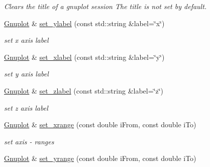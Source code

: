 \begin{DoxyCompactItemize}
\begin{DoxyCompactList}\small\item\em Clears the title of a gnuplot session The title is not set by default. \end{DoxyCompactList}\item 
\hyperlink{classkukadu_1_1Gnuplot}{Gnuplot} \& \hyperlink{classkukadu_1_1Gnuplot_abee1cfd744420fd989db8092acedcc93}{set\+\_\+ylabel} (const std\+::string \&label=\char`\"{}x\char`\"{})\hypertarget{classkukadu_1_1Gnuplot_abee1cfd744420fd989db8092acedcc93}{}\label{classkukadu_1_1Gnuplot_abee1cfd744420fd989db8092acedcc93}

\begin{DoxyCompactList}\small\item\em set x axis label \end{DoxyCompactList}\item 
\hyperlink{classkukadu_1_1Gnuplot}{Gnuplot} \& \hyperlink{classkukadu_1_1Gnuplot_a48b3c2b23f740375b73d27d1906968d0}{set\+\_\+xlabel} (const std\+::string \&label=\char`\"{}y\char`\"{})\hypertarget{classkukadu_1_1Gnuplot_a48b3c2b23f740375b73d27d1906968d0}{}\label{classkukadu_1_1Gnuplot_a48b3c2b23f740375b73d27d1906968d0}

\begin{DoxyCompactList}\small\item\em set y axis label \end{DoxyCompactList}\item 
\hyperlink{classkukadu_1_1Gnuplot}{Gnuplot} \& \hyperlink{classkukadu_1_1Gnuplot_a439a74f49c171b12df1a941a39b3e8c1}{set\+\_\+zlabel} (const std\+::string \&label=\char`\"{}z\char`\"{})\hypertarget{classkukadu_1_1Gnuplot_a439a74f49c171b12df1a941a39b3e8c1}{}\label{classkukadu_1_1Gnuplot_a439a74f49c171b12df1a941a39b3e8c1}

\begin{DoxyCompactList}\small\item\em set z axis label \end{DoxyCompactList}\item 
\hyperlink{classkukadu_1_1Gnuplot}{Gnuplot} \& \hyperlink{classkukadu_1_1Gnuplot_a1e27f156415728196a52946e304f5d1e}{set\+\_\+xrange} (const double i\+From, const double i\+To)\hypertarget{classkukadu_1_1Gnuplot_a1e27f156415728196a52946e304f5d1e}{}\label{classkukadu_1_1Gnuplot_a1e27f156415728196a52946e304f5d1e}

\begin{DoxyCompactList}\small\item\em set axis -\/ ranges \end{DoxyCompactList}\item 
\hyperlink{classkukadu_1_1Gnuplot}{Gnuplot} \& \hyperlink{classkukadu_1_1Gnuplot_a5b27c86aa6c5505aa9b7f65958f1da26}{set\+\_\+yrange} (const double i\+From, const double i\+To)\hypertarget{classkukadu_1_1Gnuplot_a5b27c86aa6c5505aa9b7f65958f1da26}{}\label{classkukadu_1_1Gnuplot_a5b27c86aa6c5505aa9b7f65958f1da26}


\end{DoxyCompactItemize}
